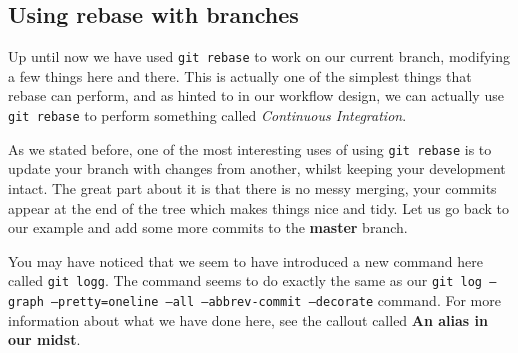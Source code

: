 \subsection{Using rebase with branches}

Up until now we have used \texttt{git rebase} to work on our current branch, modifying a few things here and there.
This is actually one of the simplest things that rebase can perform, and as hinted to in our workflow design, we can actually use \texttt{git rebase} to perform something called \emph{Continuous Integration}.

As we stated before, one of the most interesting uses of using \texttt{git rebase} is to update your branch with changes from another, whilst keeping your development intact.
The great part about it is that there is no messy merging, your commits appear at the end of the tree which makes things nice and tidy.
Let us go back to our example and add some more commits to the \textbf{master} branch.


You may have noticed that we seem to have introduced a new command here called \texttt{git logg}.
The command seems to do exactly the same as our \texttt{git log --graph --pretty=oneline --all --abbrev-commit --decorate} command.
For more information about what we have done here, see the callout called \textbf{An alias in our midst}.

